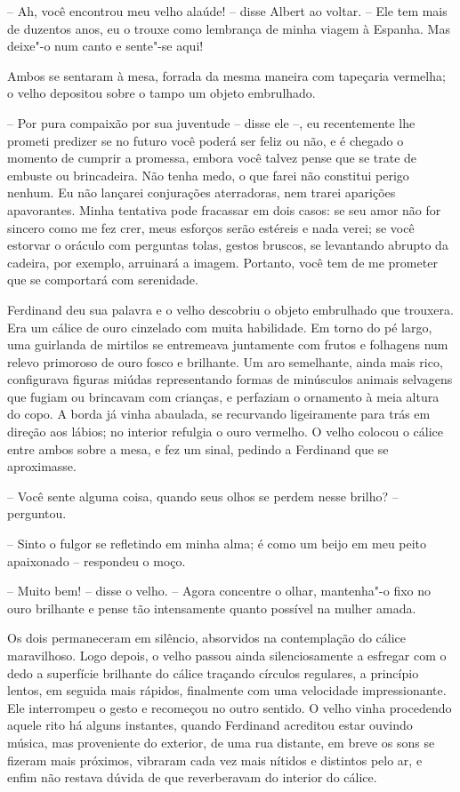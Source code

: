 -- Ah, você encontrou meu velho alaúde! -- disse Albert ao voltar. --
Ele tem mais de duzentos anos, eu o trouxe como lembrança de minha
viagem à Espanha. Mas deixe"-o num canto e sente"-se aqui!

Ambos se sentaram à mesa, forrada da mesma maneira com tapeçaria
vermelha; o velho depositou sobre o tampo um objeto embrulhado. 

-- Por pura compaixão por sua juventude -- disse ele --, eu recentemente
lhe prometi predizer se no futuro você poderá ser feliz ou não, e é
chegado o momento de cumprir a promessa, embora você talvez pense que
se trate de embuste ou brincadeira. Não tenha medo, o que farei não
constitui perigo nenhum. Eu não lançarei conjurações aterradoras, nem
trarei aparições apavorantes. Minha tentativa pode fracassar em dois
casos: se seu amor não for sincero como me fez crer, meus esforços
serão estéreis e nada verei; se você estorvar o oráculo com perguntas
tolas, gestos bruscos, se levantando abrupto da cadeira, por exemplo,
arruinará a imagem. Portanto, você tem de me prometer que se comportará
com serenidade. 

Ferdinand deu sua palavra e o velho descobriu o objeto embrulhado que
trouxera. Era um cálice de ouro cinzelado com muita habilidade. Em
torno do pé largo, uma guirlanda de mirtilos se entremeava juntamente
com frutos e folhagens num relevo primoroso de ouro fosco e brilhante.
Um aro semelhante, ainda mais rico, configurava figuras miúdas
representando formas de minúsculos animais selvagens que fugiam ou
brincavam com crianças, e perfaziam o ornamento à meia altura do copo.
A borda já vinha abaulada, se recurvando ligeiramente para trás em
direção aos lábios; no interior refulgia o ouro vermelho. O velho
colocou o cálice entre ambos sobre a mesa, e fez um sinal, pedindo a
Ferdinand que se aproximasse.

 -- Você sente alguma coisa, quando seus olhos se perdem nesse
brilho? -- perguntou.

-- Sinto o fulgor se refletindo em minha alma; é como um beijo em
meu peito apaixonado -- respondeu o moço.

-- Muito bem! -- disse o velho. -- Agora concentre o olhar, mantenha"-o
fixo no ouro brilhante e pense tão intensamente quanto possível na
mulher amada. 

Os dois permaneceram em silêncio, absorvidos na contemplação do cálice
maravilhoso. Logo depois, o velho passou ainda silenciosamente a
esfregar com o dedo a \mbox{superfície} brilhante do cálice traçando círculos
regulares, a princípio lentos, em seguida mais rápidos, finalmente com
uma velocidade impressionante. Ele interrompeu o gesto e recomeçou no
outro sentido. O velho vinha procedendo aquele rito há alguns
instantes, quando Ferdinand acreditou estar ouvindo música, mas
proveniente do exterior, de uma rua distante, em breve os sons se
fizeram mais próximos, vibraram cada vez mais nítidos e distintos pelo
ar, e enfim não restava dúvida de que reverberavam do interior do cálice.

